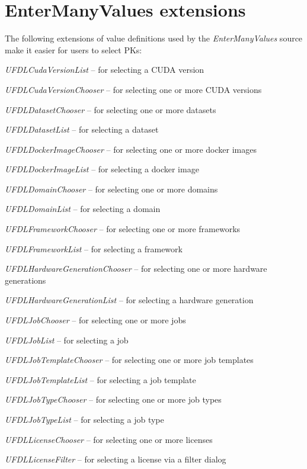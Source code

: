 \documentclass[a4paper]{book}
\begin{document}
\section{EnterManyValues extensions}
The following extensions of value definitions used by the \textit{EnterManyValues}
source make it easier for users to select PKs:
\begin{tight_itemize}
  \item \textit{UFDLCudaVersionList} -- for selecting a CUDA version
  \item \textit{UFDLCudaVersionChooser} -- for selecting one or more CUDA versions
  \item \textit{UFDLDatasetChooser} -- for selecting one or more datasets
  \item \textit{UFDLDatasetList} -- for selecting a dataset
  \item \textit{UFDLDockerImageChooser} -- for selecting one or more docker images
  \item \textit{UFDLDockerImageList} -- for selecting a docker image
  \item \textit{UFDLDomainChooser} -- for selecting one or more domains
  \item \textit{UFDLDomainList} -- for selecting a domain
  \item \textit{UFDLFrameworkChooser} -- for selecting one or more frameworks
  \item \textit{UFDLFrameworkList} -- for selecting a framework
  \item \textit{UFDLHardwareGenerationChooser} -- for selecting one or more hardware generations
  \item \textit{UFDLHardwareGenerationList} -- for selecting a hardware generation
  \item \textit{UFDLJobChooser} -- for selecting one or more jobs
  \item \textit{UFDLJobList} -- for selecting a job
  \item \textit{UFDLJobTemplateChooser} -- for selecting one or more job templates
  \item \textit{UFDLJobTemplateList} -- for selecting a job template
  \item \textit{UFDLJobTypeChooser} -- for selecting one or more job types
  \item \textit{UFDLJobTypeList} -- for selecting a job type
  \item \textit{UFDLLicenseChooser} -- for selecting one or more licenses
  \item \textit{UFDLLicenseFilter} -- for selecting a license via a filter dialog

\end{tight_itemize}
\end{document}
